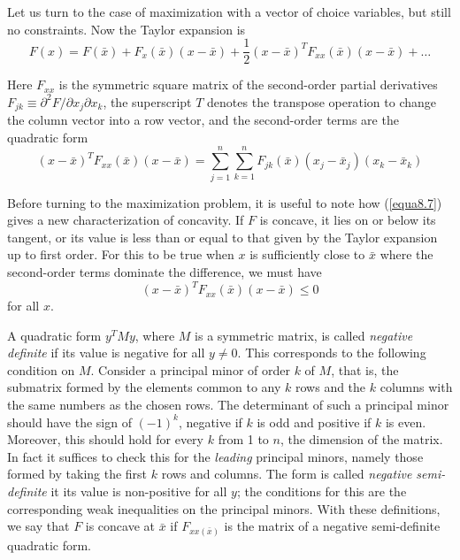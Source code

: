 Let us turn to the case of maximization with a vector of choice variables, but still no constraints. Now the Taylor expansion is
\begin{equation} \label{equa8.7}
F(x) = F(\bar{x}) + F_x(\bar{x})(x-\bar{x}) + \frac{1}{2}(x-\bar{x})^TF_{xx}(\bar{x})(x-\bar{x}) + \dots
\end{equation}

Here $F_{xx}$ is the symmetric square matrix of the second-order partial derivatives $F_{jk} \equiv \partial^2 F/ \partial x_j \partial x_k$, the superscript $T$ denotes the transpose operation to change the column vector into a row vector, and the second-order terms are the quadratic form
\begin{equation} \label{equa8.8}
(x-\bar{x})^T F_{xx} (\bar{x}) (x-\bar{x}) = \sum_{j=1}^n \sum_{k=1}^n F_{jk}(\bar{x}) (x_j - \bar{x}_j) (x_k - \bar{x}_k)
\end{equation}

Before turning to the maximization problem, it is useful to note how (\ref{equa8.7}) gives a new characterization of concavity. If $F$ is concave, it lies on or below its tangent, or its value is less than or equal to that given by the Taylor expansion up to first order. For this to be true when $x$ is sufficiently close to $\bar{x}$ where the second-order terms dominate the difference, we must have
\begin{equation*}
(x-\bar{x})^T F_{xx}(\bar{x}) (x-\bar{x}) \leq 0
\end{equation*}
for all $x$.

A quadratic form $y^T M y$, where $M$ is a symmetric matrix, is called \textit{negative definite} if its value is negative for all $y \neq 0$. This corresponds to the following condition on $M$. Consider a principal minor of order $k$ of $M$, that is, the submatrix formed by the elements common to any $k$ rows and the $k$ columns with the same numbers as the chosen rows. The determinant of such a principal minor should have the sign of $(-1)^k$, negative if $k$ is odd and positive if $k$ is even. Moreover, this should hold for every $k$ from 1 to $n$, the dimension of the matrix. In fact it suffices to check this for the \textit{leading} principal minors, namely those formed by taking the first $k$ rows and columns. The form is called \textit{negative semi-definite} it its value is non-positive for all $y$; the conditions for this are the corresponding weak inequalities on the principal minors. With these definitions, we say that $F$ is concave at $\bar{x}$ if $F_{xx(\bar{x})}$ is the matrix of a negative semi-definite quadratic form.

